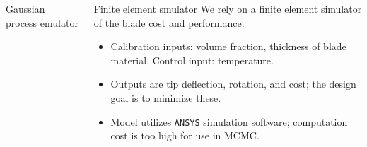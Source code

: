 \documentclass[final]{beamer}
\newlength{\onecolwid}
\newlength{\twocolwid}
\begin{document}
\begin{frame}[t]
\begin{columns}[t]
\begin{column}{\twocolwid}
\begin{columns}[t,totalwidth=\twocolwid]
\begin{column}{\onecolwid}
\begin{alertblock}{Gaussian process emulator}
\end{alertblock}



\end{column} %

\begin{column}{\onecolwid}\vspace{-.6in} %


\begin{alertblock}{Finite element smulator}
We rely on a finite element simulator of the blade cost and performance.

\begin{figure}[h!]
\label{blade}
\end{figure}

\vspace{-10mm}
\begin{itemize}
\item Calibration inputs: volume fraction, thickness of blade material. Control input: temperature.


\item Outputs are tip deflection, rotation, and cost; the design goal is to minimize these.

\item Model utilizes \texttt{ANSYS} simulation software; computation cost is too high for use in MCMC.


\end{itemize}
\end{alertblock}


\end{column}
\end{columns}
\end{column}
\end{columns}
\end{frame}
\end{document}
